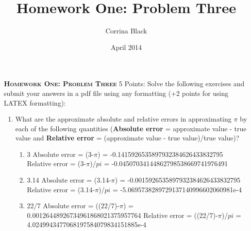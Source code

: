 \documentclass[12pt,a4paper,oneside,draft]{article}
\title{Homework One: Problem Three}
\author{Corrina Black}
\date{April 2014}
\begin{document}
\noindent\textsc{\Large\textbf{Homework One: Problem Three}}
\newline
\newline
\normalsize  
5 Points: Solve the following exercises and submit your answers in a pdf file using any formatting (+2 points for using LATEX formatting): 
\begin{enumerate}
     \item What are the approximate absolute and relative errors in approximating $\pi$ by each of the following quantities (\textbf{Absolute error} = approximate value - true value and \textbf{Relative error} = (approximate value - true value)/true value)?
	\begin{enumerate}
    	\item 3
    	\newline
    	\textcolor[rgb]{1,.5,0}{Absolute error = (3-$\pi$) = -0.1415926535897932384626433832795}
    	\newline
    	\textcolor[rgb]{1,.5,0}{Relative error = (3-$\pi$)/$pi$ = -0.04507034144862798538669741976491}
    	\item 3.14
    	\newline
    	\textcolor[rgb]{1,.5,0}{Absolute error = (3.14-$\pi$) = -0.0015926535897932384626433832795}
    	\newline
    	\textcolor[rgb]{1,.5,0}{Relative error = (3.14-$\pi$)/$pi$ = -5.0695738289729137140996602060981e-4}
     	\item 22/7
    	\newline
    	\textcolor[rgb]{1,.5,0}{Absolute error = ((22/7)-$\pi$) = 0.00126448926734961868021375957764}
    	\newline
    	\textcolor[rgb]{1,.5,0}{Relative error = ((22/7)-$\pi$)/$pi$ = 4.0249943477068197584079834151885e-4}
     \end{enumerate}
     

\end{enumerate}
\end{document}
